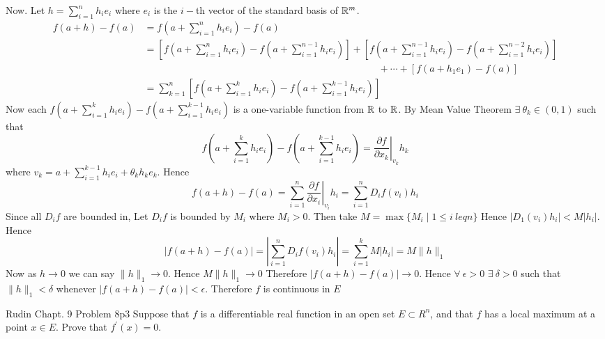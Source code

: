 \documentclass[a4paper, 11pt]{article}
\begin{document}
{		Now. Let $h=\sum\limits_{i=1}^n h_ie_i$ where $e_i$ is the $i-$th vector of the standard basis of $\mathbb{R}^m$. \begin{align*}
		f(a+h)-f(a) & =f\left(a+\sum_{i=1}^nh_ie_i\right)-f(a)                                                                                                                                                                                                      \\
		            & =\left[f\left(a+\sum_{i=1}^nh_ie_i\right)-f\left(a+\sum_{i=1}^{n-1}h_ie_i\right)\right]+\left[f\left(a+\sum_{i=1}^{n-1}h_ie_i\right)-f\left(a+\sum_{i=1}^{n-2}h_ie_i\right)\right]\\
		            & \qquad\qquad\qquad\qquad\qquad\qquad\qquad\qquad\qquad\qquad\qquad\qquad+\cdots+\left[f\left(a+h_1e_1\right)-f\left(a\right)\right] \\
		            & =\sum_{k=1}^n\left[f\left(a+\sum_{i=1}^kh_ie_i\right)-f\left(a+\sum_{i=1}^{k-1}h_ie_i\right)\right]
	\end{align*} Now each $f\left(a+\sum\limits_{i=1}^kh_ie_i\right)-f\left(a+\sum\limits_{i=1}^{k-1}h_ie_i\right)$ is a one-variable function from $\mathbb{R}$ to $\mathbb{R}$. By Mean Value Theorem $\exists \ \theta_k\in \left(0,1\right)$ such that $$f\left(a+\sum\limits_{i=1}^kh_ie_i\right)-f\left(a+\sum\limits_{i=1}^{k-1}h_ie_i\right)=\left.\frac{\partial f}{\partial x_k}\right|_{v_k}h_k$$where $v_k= a+\sum\limits_{i=1}^{k-1} h_ie_i+\theta_k h_k e_k$. Hence $$f(a+h)-f(a)=\sum_{i=1}^n \left.\frac{\partial f}{\partial x_i}\right|_{v_i}h_i=\sum_{i=1}^nD_if(v_i)h_i$$Since all $D_if$ are bounded in, Let $D_if$ is bounded by $M_i$ where $M_i>0$. Then take $M=\max\{M_i\mid 1\leq i\ leq n\}$ Hence $\left|D_1(v_i)h_i\right|<M|h_i|$. Hence
	$$|f(a+h)-f(a)|=\left|\sum_{i=1}^nD_if(v_i)h_i\right|=\sum_{i=1}^kM|h_i|=M\|h\|_1$$Now as $h\to 0$ we can say $\|h\|_1\to 0$. Hence $M\|h\|_1\to 0$ Therefore $|f(a+h)-f(a)|\to 0$. Hence $\forall\ \epsilon>0$ $\exists\ \delta>0$ such that $\|h\|_1<\delta$ whenever $|f(a+h)-f(a)|<\epsilon$. Therefore $f$ is continuous in $E$}
	
	
	
	\begin{problem}{Rudin Chapt. 9 Problem 8}{p3%
		}
		Suppose that $f$ is a differentiable real function in an open set $E \subset R^{n}$, and that $f$ has a local maximum at a point $x \in E$. Prove that $f^{\prime}(x)=0$.
	\end{problem}
	
\end{document}
